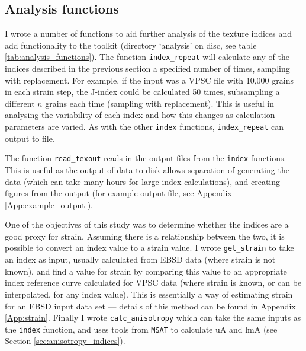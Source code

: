 \documentclass[a4paper,12pt,twoside]{report}
\numberwithin{equation}{chapter}
\begin{document}
\subsection{Analysis functions}

I wrote a number of functions to aid further analysis of the texture indices and add functionality to the toolkit (directory \lq{}analysis\rq{} on disc, see table \ref{tab:analysis_functions}). The function \texttt{index\_{}repeat} will calculate any of the indices described in the previous section a specified number of times, sampling with replacement. For example, if the input was a VPSC file with 10,000 grains in each strain step, the J-index could be calculated 50 times, subsampling a different $n$ grains each time (sampling with replacement). This is useful in analysing the variability of each index and how this changes as calculation parameters are varied.  As with the other \texttt{index} functions, \texttt{index\_{}repeat} can output to file.

The function \texttt{read\_{}texout} reads in the output files from the \texttt{index} functions. This is useful as the output of data to disk allows separation of generating the data (which can take many hours for large index calculations), and creating figures from the output (for example output file, see Appendix \ref{App:example_output}).

One of the objectives of this study was to determine whether the indices are a good proxy for strain. Assuming there is a relationship between the two, it is possible to convert an index value to a strain value. I wrote \texttt{get\_{}strain} to take an index as input, usually calculated from EBSD data (where strain is not known), and find a value for strain by comparing this value to an appropriate index reference curve calculated for VPSC data (where strain is known, or can be interpolated, for any index value). This is essentially a way of estimating strain for an EBSD input data set --- details of this method can be found in Appendix \ref{App:strain}. Finally I wrote \texttt{calc\_{}anisotropy} which can take the same inputs as the \texttt{index} function, and uses tools from \texttt{MSAT} to calculate uA and lmA (see Section \ref{sec:anisotropy_indices}).
\end{document}
